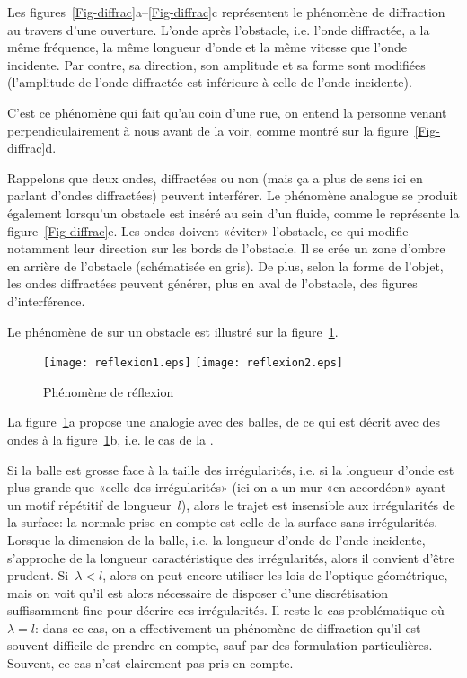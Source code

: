 Les figures~\ref{Fig-diffrac}a--\ref{Fig-diffrac}c représentent le phénomène de diffraction au travers d'une ouverture. L'onde après l'obstacle, i.e. l'onde diffractée, a la même fréquence, la même longueur d'onde et la même vitesse que l'onde incidente. Par contre, sa direction, son amplitude et sa forme sont modifiées (l'amplitude de l'onde diffractée  est inférieure à celle de l'onde incidente). 

C'est ce phénomène qui fait qu'au coin d'une rue, on entend la personne venant perpendiculairement à nous avant de la voir, comme montré sur la figure~\ref{Fig-diffrac}d.

Rappelons que deux ondes, diffractées ou non (mais ça a plus de sens ici en parlant d'ondes diffractées) peuvent interférer.
Le phénomène analogue se produit également lorsqu'un obstacle est inséré au sein d'un fluide, comme le représente la figure~\ref{Fig-diffrac}e. Les ondes doivent «éviter» l'obstacle, ce qui modifie notamment leur direction sur les bords de l'obstacle.
Il se crée un zone d'ombre en arrière de l'obstacle (schématisée en gris).
De plus, selon la forme de l'objet, les ondes diffractées peuvent générer, plus en aval de l'obstacle, des figures d'interférence.

\medskip
Le phénomène de  sur un obstacle est illustré sur la figure~\ref{Fig-reflex}.
\begin{figure}[h!]
\centering
\texttt{[image: reflexion1.eps]}\hspace{2cm}
\texttt{[image: reflexion2.eps]}
\caption{Phénomène de réflexion}\label{Fig-reflex}
\end{figure}
La figure~\ref{Fig-reflex}a propose une analogie avec des balles, de ce qui est décrit avec des ondes à la figure~\ref{Fig-reflex}b, i.e. le cas de la .

Si la balle est grosse face à la taille des irrégularités, i.e. si la longueur d'onde est plus grande que «celle des irrégularités» (ici on a un mur «en accordéon» ayant un motif répétitif de longueur~$l$), alors le trajet est insensible aux irrégularités de la surface: la normale prise en compte est celle de la surface sans irrégularités. Lorsque la dimension de la balle, i.e. la longueur d'onde de l'onde incidente, s'approche de la longueur caractéristique des irrégularités, alors il convient d'être prudent. Si~$\lambda<l$, alors on peut encore utiliser les lois de l'optique géométrique, mais on voit qu'il est alors nécessaire de disposer d'une discrétisation suffisamment fine pour décrire ces irrégularités. Il reste le cas problématique où~$\lambda=l$: dans ce cas, on a effectivement un phénomène de diffraction qu'il est souvent difficile de prendre en compte, sauf par des formulation particulières. Souvent, ce cas n'est clairement pas pris en compte.


